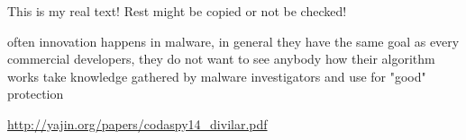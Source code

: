 This is my real text! Rest might be copied or not be checked!

often innovation happens in malware, in general they have the same goal as every commercial developers, they do not want to see anybody how their algorithm works
take knowledge gathered by malware investigators and use for "good" protection

\url{http://yajin.org/papers/codaspy14_divilar.pdf}
